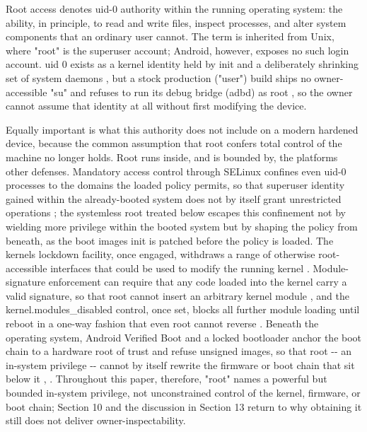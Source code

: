 \documentclass[
]{article}
\begin{document}
Root access denotes uid-0 authority within the running operating system:
the ability, in principle, to read and write files, inspect processes,
and alter system components that an ordinary user cannot. The term is
inherited from Unix, where "root" is the superuser account; Android,
however, exposes no such login account. uid 0 exists as a kernel
identity held by init and a deliberately shrinking set of system daemons
\citep{aosp-root-process-isolation}, but a stock production ("user")
build ships no owner-accessible "su" and refuses to run its debug bridge
(adbd) as root \citep{aosp-adb-root}, so the owner cannot assume that
identity at all without first modifying the device.

Equally important is what this authority does not include on a modern
hardened device, because the common assumption that root confers total
control of the machine no longer holds. Root runs inside, and is bounded
by, the platform\textquotesingle s other defenses. Mandatory access
control through SELinux confines even uid-0 processes to the domains the
loaded policy permits, so that superuser identity gained within the
already-booted system does not by itself grant unrestricted operations
\citep{aosp-selinux}; the systemless root treated below escapes this
confinement not by wielding more privilege within the booted system but
by shaping the policy from beneath, as the boot image\textquotesingle s
init is patched before the policy is loaded. The
kernel\textquotesingle s lockdown facility, once engaged, withdraws a
range of otherwise root-accessible interfaces that could be used to
modify the running kernel \citep{kernel-lockdown}. Module-signature
enforcement can require that any code loaded into the kernel carry a
valid signature, so that root cannot insert an arbitrary kernel module
\citep{kernel-module-signing}, and the kernel.modules\_disabled control,
once set, blocks all further module loading until reboot in a one-way
fashion that even root cannot reverse \citep{kernel-modules-disabled}.
Beneath the operating system, Android Verified Boot and a locked
bootloader anchor the boot chain to a hardware root of trust and refuse
unsigned images, so that root -\/- an in-system privilege -\/- cannot by
itself rewrite the firmware or boot chain that sit below it
\citep{aosp-verified-boot}, \citep{aosp-bootloader-locking}. Throughout
this paper, therefore, "root" names a powerful but bounded in-system
privilege, not unconstrained control of the kernel, firmware, or boot
chain; Section 10 and the discussion in Section 13 return to why
obtaining it still does not deliver owner-inspectability.
\end{document}
